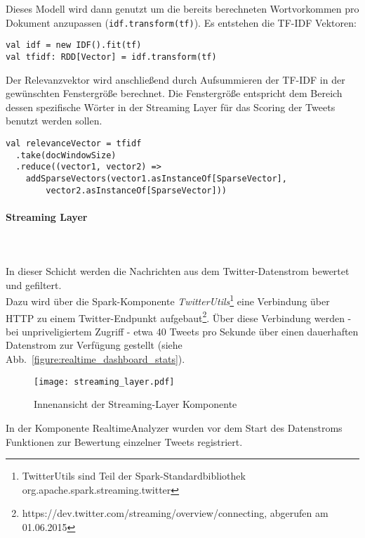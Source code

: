Dieses Modell wird dann genutzt um die bereits berechneten Wortvorkommen pro Dokument anzupassen (\lstinline|idf.transform(tf)|). Es entstehen die TF-IDF Vektoren:

\begin{lstlisting}
val idf = new IDF().fit(tf)
val tfidf: RDD[Vector] = idf.transform(tf)
\end{lstlisting}

Der Relevanzvektor wird anschließend durch Aufsummieren der TF-IDF in der gewünschten Fenstergröße berechnet. Die Fenstergröße entspricht dem Bereich dessen spezifische Wörter in der Streaming Layer für das Scoring der Tweets benutzt werden sollen.

\begin{lstlisting}
val relevanceVector = tfidf
  .take(docWindowSize)
  .reduce((vector1, vector2) =>
    addSparseVectors(vector1.asInstanceOf[SparseVector], 
		vector2.asInstanceOf[SparseVector]))
\end{lstlisting}

\paragraph{Streaming Layer}\\
\\

In dieser Schicht werden die Nachrichten aus dem Twitter-Datenstrom bewertet und gefiltert.\\

Dazu wird über die Spark-Komponente \textit{TwitterUtils}\footnote{TwitterUtils sind Teil der Spark-Standardbibliothek org.apache.spark.streaming.twitter} eine Verbindung über HTTP zu einem Twitter-Endpunkt aufgebaut\footnote{https://dev.twitter.com/streaming/overview/connecting, abgerufen am 01.06.2015}. Über diese Verbindung werden - bei unpriveligiertem Zugriff - etwa 40 Tweets pro Sekunde über einen dauerhaften Datenstrom zur Verfügung gestellt (siehe Abb.~\ref{figure:realtime_dashboard_stats}).\\

\begin{figure}[ht!]
	\centering
  \texttt{[image: streaming\_layer.pdf]}
	\caption{Innenansicht der Streaming-Layer Komponente}
	\label{figure:demo_app_streaminglayer}
\end{figure}

In der Komponente RealtimeAnalyzer wurden vor dem Start des Datenstroms Funktionen zur Bewertung einzelner Tweets registriert.\\


